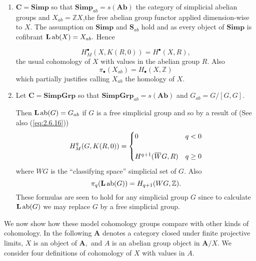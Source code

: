 \documentclass[../main]{subfiles}
\begin{document}
\begin{examples} 
   \begin{enumerate} 
     \item $\mathbf{C} = \mathbf{Simp} $ so that $\mathbf{Simp}_{ab} = s(\mathbf{Ab})$ the category of simplicial abelian groups and $X_{ab} = \mathbb{Z}X$,the free abelian group functor applied dimension-wise to $X$. The assumption on $\mathbf{Simp}$ and $\mathbf S_{ab}$ hold and as every object of $\mathbf{Simp}$ is cofibrant $\mathbf L \operatorname{ab} (X) = X_{ab}.$ Hence 

       \[ 
          H_{M}^{\bullet} (X,K(R,0)) = H^\bullet (X,R),
       \] 
the usual cohomology of $X$ with values in the abelian group $R$. Also 
       \[ 
         \pi_{\bullet}(X_{ab}) = H_{\bullet}(X, \mathbb{Z})
       \] 
       which partially justifies calling $X_{ab}$ the homology of $X$.
       

     \item Let $\mathbf{C} = \mathbf{SimpGrp} $ so that $\mathbf{SimpGrp}_{ab} = s(\mathbf{Ab})$ and $G_{ab} = G / [G,G].$ 

       Then $\mathbf L \operatorname{ab}(G) = G_{ab}$ if $G$ is a free simplicial group and so by a result of \cite{kan_hurewicz_1958} (See also (\ref{eq:2.6.16})) 
             \[ 
               H_{M}^{q} (G,K(R,0)) = 
               \begin{cases} 
                 0 & q <0 \\
                  & \\
                 H^{q+1}(\xoverline WG,R) & q \ge 0
               \end{cases}
             \] 
             where $WG$ is the ``classifying space'' simplicial set of $G$. Also
             \[ 
               \pi_{q}(\mathbf{L}\operatorname{ab} (G)) = H_{q+1}(WG, \mathbb{Z}).
             \] 
             These formulas are seen to hold for any simplicial group $G$ since to calculate $\mathbf{L} \operatorname{ab}(G)$ we may replace $G$ by a free simplicial group.
   \end{enumerate} 
\end{examples}


We now show how these model cohomology groups compare with other kinds of cohomology. In the following $\mathbf A$ denotes a category closed under finite projective limits, $X$ is an object of $\mathbf A,$ and $A$ is an abelian group object in $\mathbf A/X.$ We consider four definitions of cohomology of $X$ with values in $A.$ 
\end{document}
